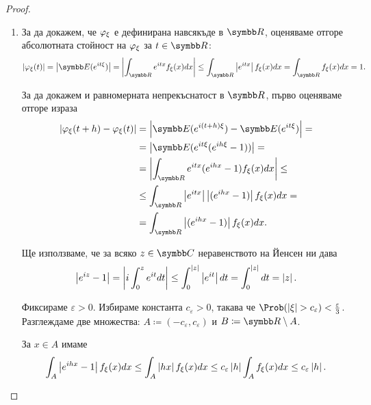 \documentclass[
  headings=standardclasses,
  bibliography=totocnumbered,
]{scrartcl}
\begin{document}
\begin{proof}
  \mbox{}
  \begin{enumerate}
    \item За да докажем, че \( \varphi_\xi \) е дефинирана навсякъде в \( \R \), оценяваме отгоре абсолютната стойност на \( \varphi_\xi \) за \( t \in \R \):
    \begin{equation*}
      \Abs{\Char_\xi(t)}
      =
      \Abs{\Expect(e^{it\xi})}
      =
      \Abs{\int_{\R} e^{itx} f_\xi(x) dx}
      \leq
      \int_{\R} \Abs{e^{itx}} f_\xi(x) dx
      =
      \int_{\R} f_\xi(x) dx
      =
      1.
    \end{equation*}

    За да докажем и равномерната непрекъснатост в \( \R \), първо оценяваме отгоре израза
    \begin{align*}
      \Abs{\Char_\xi(t + h) - \Char_\xi(t)}
      &=
      \Abs{\Expect(e^{i(t + h)\xi}) - \Expect(e^{it\xi})}
      = \\ &=
      \Abs{\Expect(e^{it\xi} (e^{ih\xi} - 1))}
      = \\ &=
      \Abs{\int_{\R} e^{itx} (e^{ihx} - 1) f_\xi(x) dx}
      \leq \\ &\leq
      \int_{\R} \Abs{e^{itx}} \Abs{(e^{ihx} - 1)} f_\xi(x) dx
      = \\ &=
      \int_{\R} \Abs{(e^{ihx} - 1)} f_\xi(x) dx.
    \end{align*}

    Ще използваме, че за всяко \( z \in \Complex \) неравенството на Йенсен ни дава
    \begin{equation*}
      \left\vert e^{iz} - 1 \right\vert
      =
      \left\vert i \int_0^z e^{it} dt \right\vert
      \leq
      \int_0^{\left\vert z \right\vert} \left\vert e^{it} \right\vert dt
      =
      \int_0^{\left\vert z \right\vert} dt
      =
      \left\vert z \right\vert.
    \end{equation*}

    Фиксираме \( \varepsilon > 0 \). Избираме константа \( c_\varepsilon > 0 \), такава че \( \Prob(\Abs{\xi} > c_\varepsilon) < \frac \varepsilon 3 \).
    Разглеждаме две множества: \( A \coloneqq (-c_\varepsilon, c_\varepsilon) \) и \( B \coloneqq \R \setminus A \).

    За \( x \in A \) имаме
    \begin{equation*}
      \int_A \left\vert e^{ihx} - 1 \right\vert f_\xi(x) dx
      \leq
      \int_A \left\vert h x \right\vert f_\xi(x) dx
      \leq
      c_\varepsilon \left\vert h \right\vert \int_A f_\xi(x) dx
      \leq
      c_\varepsilon \left\vert h \right\vert.
    \end{equation*}


\end{enumerate}
\end{proof}
\end{document}
